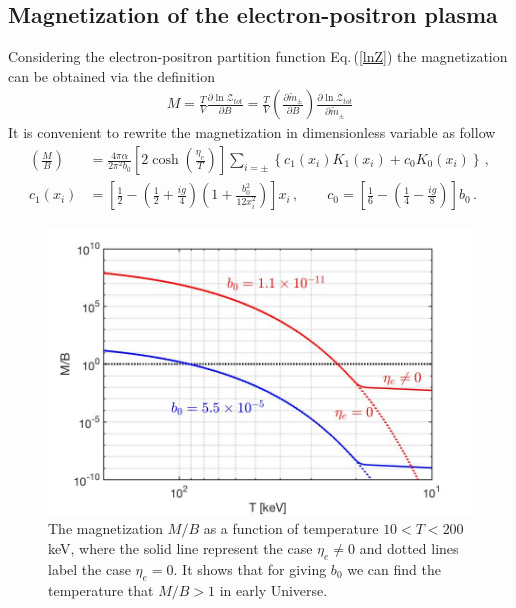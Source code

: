\documentclass[universe,article,submit,moreauthors,pdftex,a4paper]{Definitions/mdpi}
\newcommand{\req}[1]{Eq.\,(\ref{#1})}
\begin{document}
\subsection{Magnetization of the electron-positron plasma}\label{sec:Magnetization}
\noindent Considering the electron-positron partition function \req{lnZ} the magnetization can be obtained via the definition
\begin{align}
M=\frac{T}{V}\frac{\partial \ln\mathcal{Z}_{tot}}{\partial B}=\frac{T}{V}\left(\frac{\partial\tilde m_\pm}{\partial B}\right)\frac{\partial \ln\mathcal{Z}_{tot}}{\partial\tilde m_\pm}
\end{align}
It is convenient to rewrite the magnetization in dimensionless variable as follow
\begin{align}\label{Magnetization}
 \left(\frac{M}{B}\right)&=\frac{4\pi\alpha}{2\pi^2b_0}\left[2\cosh\left(\frac{\eta_{e}}{T}\right)\right]\sum_{i=\pm}\left\{c_{1}(x_{i})K_1(x_i)+c_{0}K_0(x_i)\right\}\,,\\
 c_{1}(x_{i}) &= \left[\frac{1}{2}-\left(\frac{1}{2}+\frac{ig}{4}\right)\left(1+\frac{b^2_0}{12x^2_i}\right)\right]x_i\,,\qquad c_{0} = \left[\frac{1}{6}-\left(\frac{1}{4}-\frac{ig}{8}\right)\right]b_0\,.
\end{align}
\begin{figure}[t]
\centering
\includegraphics[width=\textwidth]{./plots/MagnetizationFinal_200keV.jpg}
\caption{The magnetization $M/B$ as a function of temperature $10<T<200$ keV, where the solid line represent the case $\eta_e\neq0$ and dotted lines label the case $\eta_e=0$. It shows that for giving $b_0$ we can find the temperature that $M/B>1$ in early Universe.}
\label{Case2_fig} 
\end{figure}
\end{document}
